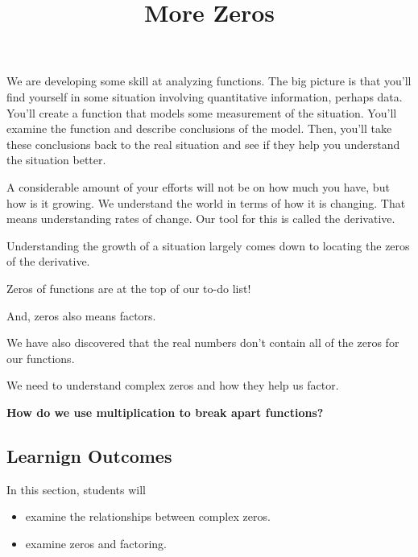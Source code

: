 \documentclass{ximera}
\title{More Zeros}
\begin{document}
\begin{abstract}
%
\end{abstract}
\maketitle




We are developing some skill at analyzing functions.  The big picture is that you'll find yourself in some situation involving quantitative information, perhaps data.  You'll create a function that models some measurement of the situation.  You'll examine the function and describe conclusions of the model.  Then, you'll take these conclusions back to the real situation and see if they help you understand the situation better.




A considerable amount of your efforts will not be on how much you have, but how is it growing.  We understand the world in terms of how it is changing.  That means understanding rates of change.  Our tool for this is called the derivative.




Understanding the growth of a situation largely comes down to locating the zeros of the derivative.


Zeros of functions are at the top of our to-do list!  

And, zeros also means factors.  


We have also discovered that the real numbers don't contain all of the zeros for our functions.  


We need to understand complex zeros and how they help us factor.  


\begin{center}
\textbf{\textcolor{red!80!black}{How do we use multiplication to break apart functions?}}
\end{center} 





















\subsection{Learnign Outcomes}


\begin{sectionOutcomes}
In this section, students will 

\begin{itemize}
\item examine the relationships between complex zeros.
\item examine zeros and factoring.
\end{itemize}
\end{sectionOutcomes}
\end{document}

